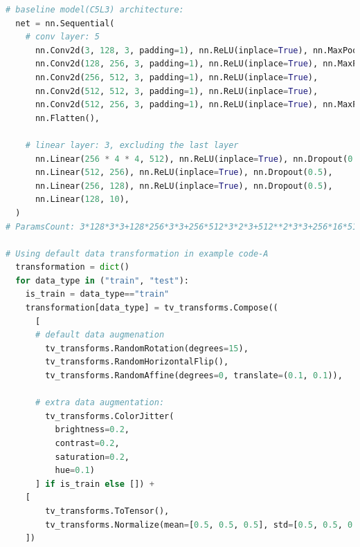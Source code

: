 \documentclass{article}
\begin{document}

      

\begin{lstlisting}[language=python]
  # baseline model(C5L3) architecture:  
  net = nn.Sequential(
    # conv layer: 5
      nn.Conv2d(3, 128, 3, padding=1), nn.ReLU(inplace=True), nn.MaxPool2d(2), nn.Dropout(0.3),
      nn.Conv2d(128, 256, 3, padding=1), nn.ReLU(inplace=True), nn.MaxPool2d(2), nn.Dropout(0.3),
      nn.Conv2d(256, 512, 3, padding=1), nn.ReLU(inplace=True),
      nn.Conv2d(512, 512, 3, padding=1), nn.ReLU(inplace=True),
      nn.Conv2d(512, 256, 3, padding=1), nn.ReLU(inplace=True), nn.MaxPool2d(2), nn.Dropout(0.3),
      nn.Flatten(),

    # linear layer: 3, excluding the last layer
      nn.Linear(256 * 4 * 4, 512), nn.ReLU(inplace=True), nn.Dropout(0.5),
      nn.Linear(512, 256), nn.ReLU(inplace=True), nn.Dropout(0.5),
      nn.Linear(256, 128), nn.ReLU(inplace=True), nn.Dropout(0.5),
      nn.Linear(128, 10),
  )
# ParamsCount: 3*128*3*3+128*256*3*3+256*512*3*2*3+512**2*3*3+256*16*512+512*256+256*128+1280=7.28M

# Using default data transformation in example code-A
  transformation = dict()
  for data_type in ("train", "test"):
    is_train = data_type=="train"
    transformation[data_type] = tv_transforms.Compose((
      [
      # default data augmenation
        tv_transforms.RandomRotation(degrees=15),
        tv_transforms.RandomHorizontalFlip(),
        tv_transforms.RandomAffine(degrees=0, translate=(0.1, 0.1)),
      
      # extra data augmentation:
        tv_transforms.ColorJitter(
          brightness=0.2, 
          contrast=0.2,
          saturation=0.2,
          hue=0.1)
      ] if is_train else []) + 
    [
        tv_transforms.ToTensor(),
        tv_transforms.Normalize(mean=[0.5, 0.5, 0.5], std=[0.5, 0.5, 0.5]),
    ])
\end{lstlisting}
\end{document}
